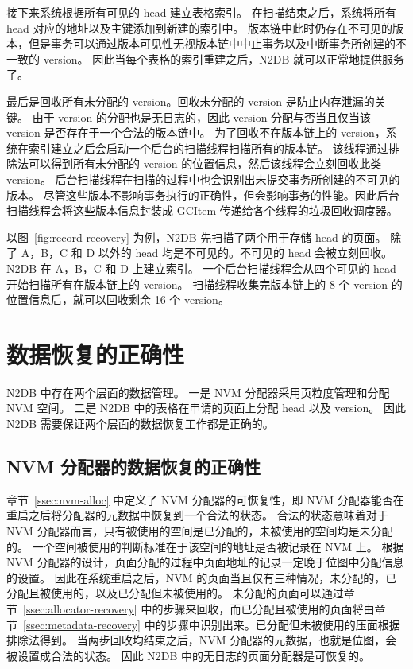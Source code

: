 接下来系统根据所有可见的 head 建立表格索引。
在扫描结束之后，系统将所有 head 对应的地址以及主键添加到新建的索引中。
版本链中此时仍存在不可见的版本，但是事务可以通过版本可见性无视版本链中中止事务以及中断事务所创建的不一致的 version。
因此当每个表格的索引重建之后，N2DB 就可以正常地提供服务了。

最后是回收所有未分配的 version。回收未分配的 version 是防止内存泄漏的关键。
由于 version 的分配也是无日志的，因此 version 分配与否当且仅当该 version 是否存在于一个合法的版本链中。
为了回收不在版本链上的 version，系统在索引建立之后会启动一个后台的扫描线程扫描所有的版本链。
该线程通过排除法可以得到所有未分配的 version 的位置信息，然后该线程会立刻回收此类 version。
后台扫描线程在扫描的过程中也会识别出未提交事务所创建的不可见的版本。
尽管这些版本不影响事务执行的正确性，但会影响事务的性能。因此后台扫描线程会将这些版本信息封装成 GCItem 传递给各个线程的垃圾回收调度器。

以图~\ref{fig:record-recovery} 为例，N2DB 先扫描了两个用于存储 head 的页面。
除了 A，B，C 和 D 以外的 head 均是不可见的。不可见的 head 会被立刻回收。
N2DB 在 A，B，C 和 D 上建立索引。
一个后台扫描线程会从四个可见的 head 开始扫描所有在版本链上的 version。
扫描线程收集完版本链上的 8 个 version 的位置信息后，就可以回收剩余 16 个 version。

\section{数据恢复的正确性}

N2DB 中存在两个层面的数据管理。
一是 NVM 分配器采用页粒度管理和分配 NVM 空间。
二是 N2DB 中的表格在申请的页面上分配 head 以及 version。
因此 N2DB 需要保证两个层面的数据恢复工作都是正确的。

\subsection{NVM 分配器的数据恢复的正确性}

章节~\ref{ssec:nvm-alloc} 中定义了 NVM 分配器的可恢复性，即 NVM 分配器能否在重启之后将分配器的元数据中恢复到一个合法的状态。
合法的状态意味着对于 NVM 分配器而言，只有被使用的空间是已分配的，未被使用的空间均是未分配的。
一个空间被使用的判断标准在于该空间的地址是否被记录在 NVM 上。
根据 NVM 分配器的设计，页面分配的过程中页面地址的记录一定晚于位图中分配信息的设置。
因此在系统重启之后，NVM 的页面当且仅有三种情况，未分配的，已分配且被使用的，以及已分配但未被使用的。
未分配的页面可以通过章节~\ref{ssec:allocator-recovery} 中的步骤来回收，而已分配且被使用的页面将由章节~\ref{ssec:metadata-recovery} 中的步骤中识别出来。已分配但未被使用的压面根据排除法得到。
当两步回收均结束之后，NVM 分配器的元数据，也就是位图，会被设置成合法的状态。
因此 N2DB 中的无日志的页面分配器是可恢复的。

